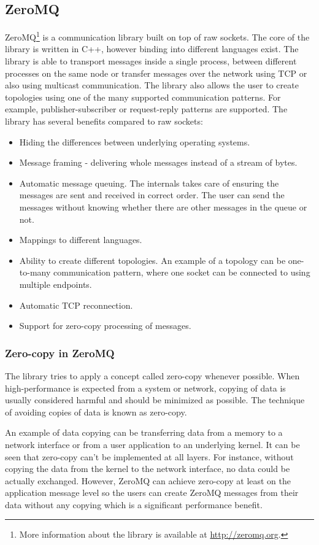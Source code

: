 \subsection{ZeroMQ}
\label{zeromq}
ZeroMQ\footnote{More information about the library is available at \url{http://zeromq.org}.} is a communication library built on top of raw sockets. The core of the library is written in C++, however binding into different languages exist. The library is able to transport messages inside a single process, between different processes on the same node or transfer messages over the network using TCP or also using multicast communication. The library also allows the user to create topologies using one of the many supported communication patterns. For example, publisher-subscriber or request-reply patterns are supported. The library has several benefits compared to raw sockets:
\begin{itemize}
	\item Hiding the differences between underlying operating systems.
	\item Message framing - delivering whole messages instead of a stream of bytes.
	\item Automatic message queuing. The internals takes care of ensuring the messages are sent and received in correct order. The user can send the messages without knowing whether there are other messages in the queue or not.
	\item Mappings to different languages.
	\item Ability to create different topologies. An example of a topology can be one-to-many communication pattern, where one socket can be connected to using multiple endpoints. 
	\item Automatic TCP reconnection.
	\item Support for zero-copy processing of messages.
\end{itemize}
\subsubsection{Zero-copy in ZeroMQ}
The library tries to apply a concept called zero-copy whenever possible. When high-performance is expected from a system or network, copying of data is usually considered harmful and should be minimized as possible. The technique of avoiding copies of data is known as zero-copy.

An example of data copying can be transferring data from a memory to a network interface or from a user application to an underlying kernel. It can be seen that zero-copy can't be implemented at all layers. For instance, without copying the data from the kernel to the network interface, no data could be actually exchanged. However, ZeroMQ can achieve zero-copy at least on the application message level so the users can create ZeroMQ messages from their data without any copying which is a significant performance benefit.
